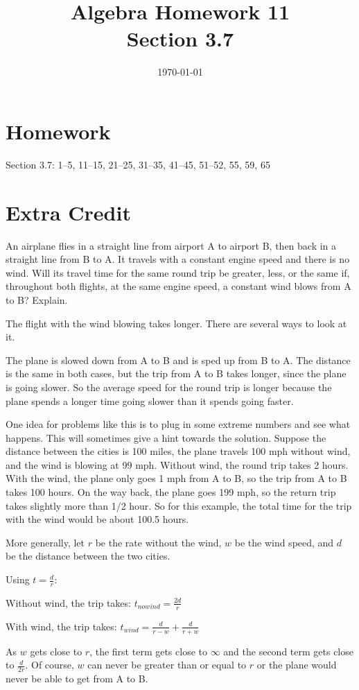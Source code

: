 \documentclass[letterpaper, landscape]{exam}
\title{Algebra Homework 11 \\ Section 3.7}
\author{}
\date{\today}
\begin{document}
  \maketitle

  \section{Homework}

  Section 3.7: 1--5, 11--15, 21--25, 31--35, 41--45, 51--52, 55, 59, 65

  \section{Extra Credit}

  An airplane flies in a straight line from airport A to airport B, then back
  in a straight line from B to A.  It travels with a constant engine speed and
  there is no wind.  Will its travel time for the same round trip be greater,
  less, or the same if, throughout both flights, at the same engine speed, a
  constant wind blows from A to B\@?  Explain.

  \begin{solution}
    The flight with the wind blowing takes longer.  There are several ways to
    look at it.

    The plane is slowed down from A to B and is sped up from B to A.  The
    distance is the same in both cases, but the trip from A to B takes longer,
    since the plane is going slower.  So the average speed for the round trip
    is longer because the plane spends a longer time going slower than it
    spends going faster.

    One idea for problems like this is to plug in some extreme numbers and see
    what happens.  This will sometimes give a hint towards the solution.
    Suppose the distance between the cities is 100 miles, the plane travels 100
    mph without wind, and the wind is blowing at 99 mph.  Without wind, the
    round trip takes 2 hours.  With the wind, the plane only goes 1 mph from A
    to B, so the trip from A to B takes 100 hours.  On the way back, the plane
    goes 199 mph, so the return trip takes slightly more than 1/2 hour.  So for
    this example, the total time for the trip with the wind would be about
    100.5 hours.

    More generally, let $r$ be the rate without the wind, $w$ be the wind
    speed, and $d$ be the distance between the two cities.  

    Using $t = \frac{d}{r}$:
    \begin{itemize*}
    \item Without wind, the trip takes: $t_{no wind} = \frac{2d}{r}$
    \item With wind, the trip takes: $t_{wind} = \frac{d}{r - w} + \frac{d}{r + w}$
    \end{itemize*}

    As $w$ gets close to $r$, the first term gets close to $\infty$ and the
    second term gets close to $\frac{d}{2r}$.  Of course, $w$ can never be
    greater than or equal to $r$ or the plane would never be able to get from A
    to B.

  \end{solution}
\end{document}

